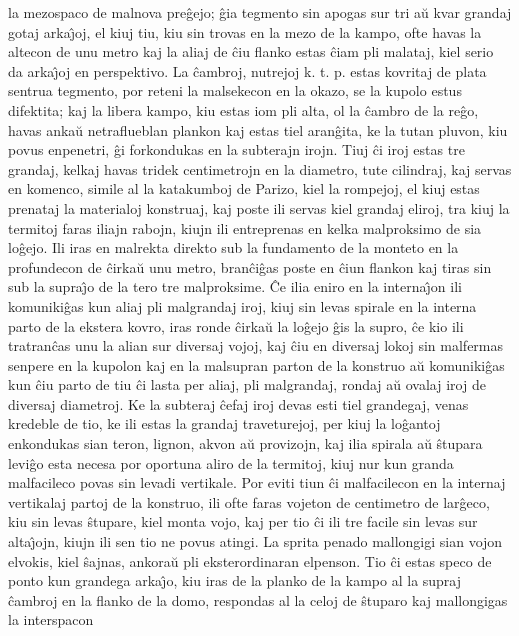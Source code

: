 la mezospaco de malnova pre\^gejo; \^gia tegmento sin apogas sur tri
a\u u kvar grandaj gotaj arka\^{\j}oj, el kiuj tiu, kiu sin trovas
en la mezo de la kampo, ofte havas la altecon de unu metro kaj la
aliaj de \^ciu flanko estas \^ciam pli malataj, kiel serio da
arka\^{\j}oj en perspektivo. La \^cambroj, nutrejoj k. t. p. estas
kovritaj de plata sentrua tegmento, por reteni la malsekecon en la
okazo, se la kupolo estus difektita; kaj la libera kampo, kiu estas
iom pli alta, ol la \^cambro de la re\^go, havas anka\u u
netraflueblan plankon kaj estas tiel aran\^gita, ke la tutan pluvon,
kiu povus enpenetri, \^gi forkondukas en la subterajn irojn. Tiuj
\^ci iroj estas tre grandaj, kelkaj havas tridek centimetrojn en la
diametro, tute cilindraj, kaj servas en komenco, simile al la
katakumboj de Parizo, kiel la rompejoj, el kiuj estas prenataj la
materialoj konstruaj, kaj poste ili servas kiel grandaj eliroj, tra
kiuj la termitoj faras iliajn rabojn, kiujn ili entreprenas en kelka
malproksimo de sia lo\^gejo. Ili iras en malrekta direkto sub la
fundamento de la monteto en la profundecon de \^cirka\u u unu metro,
bran\^ci\^gas poste en \^ciun flankon kaj tiras sin sub la
supra\^{\j}o de la tero tre malproksime. \^Ce ilia eniro en la
interna\^{\j}on ili komuniki\^gas kun aliaj pli malgrandaj iroj,
kiuj sin levas spirale en la interna parto de la ekstera kovro, iras
ronde \^cirka\u u la lo\^gejo \^gis la supro, \^ce kio ili
tratran\^cas unu la alian sur diversaj vojoj, kaj \^ciu en diversaj
lokoj sin malfermas senpere en la kupolon kaj en la malsupran parton
de la konstruo a\u u komuniki\^gas kun \^ciu parto de tiu \^ci lasta
per aliaj, pli malgrandaj, rondaj a\u u ovalaj iroj de diversaj
diametroj. Ke la subteraj \^cefaj iroj devas esti tiel grandegaj,
venas kredeble de tio, ke ili estas la grandaj traveturejoj, per
kiuj la lo\^gantoj enkondukas sian teron, lignon, akvon a\u u
provizojn, kaj ilia spirala a\u u \^stupara levi\^go esta necesa por
oportuna aliro de la termitoj, kiuj nur kun granda malfacileco povas
sin levadi vertikale. Por eviti tiun \^ci malfacilecon en la
internaj vertikalaj partoj de la konstruo, ili ofte faras vojeton de
centimetro de lar\^geco, kiu sin levas \^stupare, kiel monta vojo,
kaj per tio \^ci ili tre facile sin levas sur alta\^{\j}ojn, kiujn
ili sen tio ne povus atingi. La sprita penado mallongigi sian vojon
elvokis, kiel \^sajnas, ankora\u u pli eksterordinaran elpenson. Tio
\^ci estas speco de ponto kun grandega arka\^{\j}o, kiu iras de la
planko de la kampo al la supraj \^cambroj en la flanko de la domo,
respondas al la celoj de \^stuparo kaj mallongigas la interspacon
